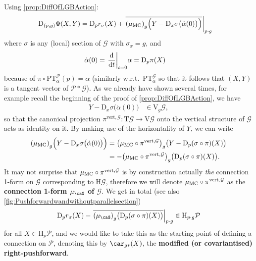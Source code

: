 \documentclass[reqno,a4paper,oneside]{amsart}
\newcommand\mutot{\mu_\caG}
\newcommand\MC{\mu_{{\rm MC}}}
\theoremstyle{plain}
\theoremstyle{remark}
\theoremstyle{definition}
\begin{document}
Using \ref{prop:DiffOfLGBAction}:
\begin{align*}
\mathrm{D}_{(p, g)}\Phi\mleft(
	X, 
	Y
\mright)
&=
\mathrm{D}_pr_\sigma\mleft( 
	X 
\mright)
	+ \mleft.{\overline{\mleft( \MC\mright)_g \Bigl(
		Y
		- \mathrm{D}_x \sigma \bigl( \dot{\alpha}(0) \bigr)
	\Bigr)}}\mright|_{p \cdot g}
\end{align*}
where $\sigma$ is any (local) section of $\mathcal{G}$ with $\sigma_x = g$, and
\begin{align*}
\dot{\alpha}(0)
&=
\mleft.\frac{\mathrm{d}}{\mathrm{d}t}\mright|_{t=0} \alpha
=
\mathrm{D}_p\pi (X)
\end{align*}
because of $\pi \circ \mathrm{PT}_\alpha^{\mathcal{P}}(p) = \alpha$ (similarly w.r.t.\ $\mathrm{PT}_\alpha^{\mathcal{G}}$ so that it follows that $(X, Y)$ is a tangent vector of $\mathcal{P}*\mathcal{G}$). As we already have shown several times, for example recall the beginning of the proof of \ref{prop:DiffOfLGBAction}, we have
\begin{align*}
Y - \mathrm{D}_x \sigma \bigl( \dot{\alpha}(0) \bigr)
&\in
\mathrm{V}_g\mathcal{G},
\end{align*}
so that the canonical projection $\pi^{\mathrm{vert}, \mathcal{G}}: \mathrm{T}\mathcal{G} \to \mathrm{V}\mathcal{G}$ onto the vertical structure of $\mathcal{G}$ acts as identity on it. By making use of the horizontality of $Y$, we can write
\begin{align*}
\mleft( \MC\mright)_g \Bigl(
		Y - \mathrm{D}_x \sigma \bigl( \dot{\alpha}(0) \bigr)
	\Bigr)
&=
\mleft( \MC \circ \pi^{\mathrm{vert}, \mathcal{G}}\mright)_g \bigl(
		Y
		- \mathrm{D}_p (\sigma \circ \pi)(X)
	\bigr)
\\
&=
-
\mleft( \MC \circ \pi^{\mathrm{vert}, \mathcal{G}}\mright)_g \bigl(
		\mathrm{D}_p (\sigma \circ \pi)(X)
	\bigr).
\end{align*}
It may not surprise that $\MC \circ \pi^{\mathrm{vert}, \mathcal{G}}$ is by construction actually \textit{the} connection 1-form on $\mathcal{G}$ corresponding to $\mathrm{H}\mathcal{G}$, therefore we will denote $\MC \circ \pi^{\mathrm{vert}, \mathcal{G}}$ as the \textbf{connection 1-form $\mutot$ of $\mathcal{G}$}. We get in total (see also \ref{fig:Pushforwardwandwithoutparallelsection})
\begin{equation}\label{OiTHatIsHowWeFormulateHorizSymmetry}
\mathrm{D}_pr_\sigma\mleft( 
	X 
\mright)
	- \mleft.{\overline{
		\mleft( \mutot\mright)_g \bigl(
		\mathrm{D}_p (\sigma \circ \pi)(X)
	\bigr)
	}}\mright|_{p \cdot g}
\in
\mathrm{H}_{p \cdot g}\mathcal{P}
\end{equation}
for all $X \in \mathrm{H}_p\mathcal{P}$, and we would like to take this as the starting point of defining a connection on $\mathcal{P}$, denoting this by $\car_{g*}(X)$, the \textbf{modified (or covariantised) right-pushforward}. 
\end{document}
